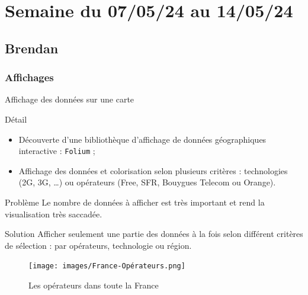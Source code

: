 \section{Semaine du 07/05/24 au 14/05/24}
\insertsectionframe
\subsection{Brendan}
\insertsubsectionframe

{
\smallframetitle
\subsubsection{Affichages}
\begin{frame}{Affichage des données sur une carte}
    \begin{block}{Détail}
        \begin{itemize}
            \item Découverte d'une bibliothèque d'affichage de données géographiques interactive : \texttt{Folium} ;
            \item Affichage des données et colorisation selon plusieurs critères : technologies (2G, 3G, \dots) ou opérateurs (Free, SFR, Bouygues Telecom ou Orange).
        \end{itemize}
    \end{block}

    \begin{alertblock}{Problème}
        Le nombre de données à afficher est très important et rend la visualisation très saccadée.
    \end{alertblock}

    \begin{block}{Solution}
        Afficher seulement une partie des données à la fois selon différent critères de sélection : par opérateurs, technologie ou région.
    \end{block}
\end{frame}



\begin{frame}{}
    \begin{figure}
        \texttt{[image: images/France-Opérateurs.png]}
        \caption{\label{fig:fr-op}Les opérateurs dans toute la France}
    \end{figure}
\end{frame}

}
